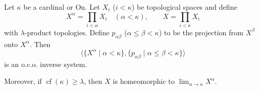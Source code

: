 Let $\kappa$ be a cardinal or $\mathrm{On}$. Let $X_i$ ($i < \kappa$) be topological spaces and define
$$X^{\alpha} = \prod_{i < \alpha} X_i \quad (\alpha < \kappa), \qquad X = \prod_{i < \kappa} X_i$$
with $\lambda$-product topologies. Define $p_{\alpha\beta}$ ($\alpha \leq \beta < \kappa$) to be the projection from $X^{\beta}$ onto $X^{\alpha}$. Then
$$\langle \{X^{\alpha} \mid \alpha < \kappa\}, \{p_{\alpha\beta} \mid \alpha \leq \beta < \kappa\} \rangle$$
is an o.c.o. inverse system.

Moreover, if $\operatorname{cf}(\kappa) \geq \lambda$, then $X$ is homeomorphic to $\displaystyle\lim_{\alpha \to \kappa} X^{\alpha}$.
